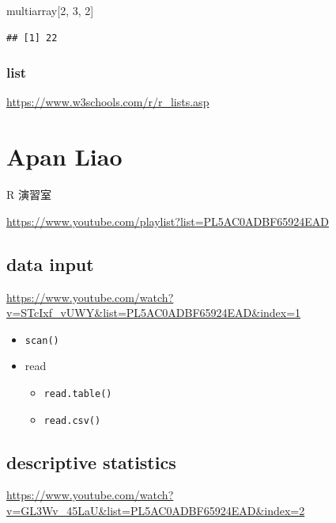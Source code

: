 \documentclass[
]{book}
\newenvironment{Shaded}{\begin{snugshade}}{\end{snugshade}}
\newcommand{\DecValTok}[1]{\textcolor[rgb]{0.00,0.00,0.81}{#1}}
\newcommand{\NormalTok}[1]{#1}
\providecommand{\tightlist}{%
  \setlength{\itemsep}{0pt}\setlength{\parskip}{0pt}}
\theoremstyle{definition}
\theoremstyle{definition}
\theoremstyle{definition}
\theoremstyle{definition}
\theoremstyle{remark}
\begin{document}
\begin{Shaded}
\begin{Highlighting}[]
\NormalTok{multiarray[}\DecValTok{2}\NormalTok{, }\DecValTok{3}\NormalTok{, }\DecValTok{2}\NormalTok{]}
\end{Highlighting}
\end{Shaded}

\begin{verbatim}
## [1] 22
\end{verbatim}

\subsubsection{list}\label{list}

\url{https://www.w3schools.com/r/r_lists.asp}

\section{Apan Liao}\label{apan-liao}

\begin{CJK}{UTF8}{bsmi}
R 演習室
\end{CJK}

\url{https://www.youtube.com/playlist?list=PL5AC0ADBF65924EAD}

\subsection{data input}\label{data-input}

\url{https://www.youtube.com/watch?v=STcIxf_vUWY&list=PL5AC0ADBF65924EAD&index=1}

\begin{itemize}
\tightlist
\item
  \texttt{scan()}
\item
  read

  \begin{itemize}
  \tightlist
  \item
    \texttt{read.table()}
  \item
    \texttt{read.csv()}
  \end{itemize}
\end{itemize}

\subsection{descriptive statistics}\label{descriptive-statistics}

\url{https://www.youtube.com/watch?v=GL3Wv_45LaU&list=PL5AC0ADBF65924EAD&index=2}
\end{document}
